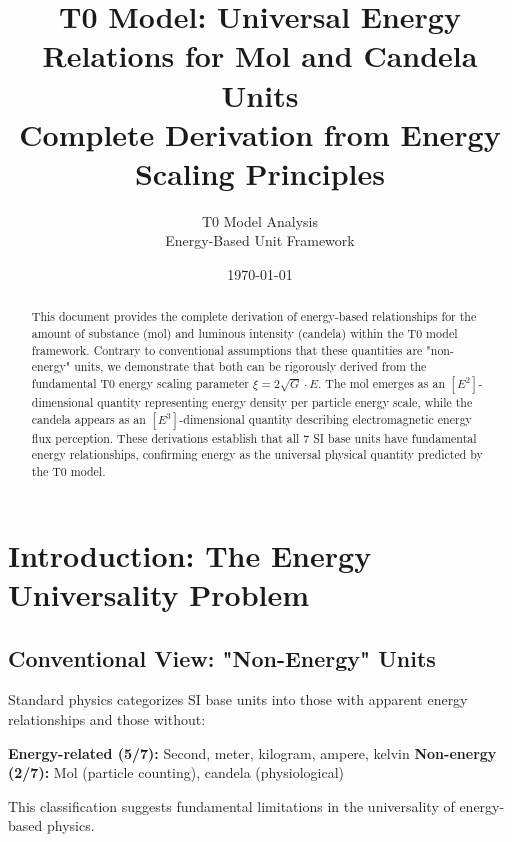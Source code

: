 \documentclass[12pt,a4paper]{article}
\newcommand{\xipar}{\xi}
\begin{document}
	
	\title{T0 Model: Universal Energy Relations for Mol and Candela Units\\
		\large Complete Derivation from Energy Scaling Principles}
	\author{T0 Model Analysis\\
		Energy-Based Unit Framework}
	\date{\today}
	
	\maketitle
	
	\begin{abstract}
		This document provides the complete derivation of energy-based relationships for the amount of substance (mol) and luminous intensity (candela) within the T0 model framework. Contrary to conventional assumptions that these quantities are "non-energy" units, we demonstrate that both can be rigorously derived from the fundamental T0 energy scaling parameter $\xipar = 2\sqrt{G} \cdot E$. The mol emerges as an $[E^2]$-dimensional quantity representing energy density per particle energy scale, while the candela appears as an $[E^3]$-dimensional quantity describing electromagnetic energy flux perception. These derivations establish that all 7 SI base units have fundamental energy relationships, confirming energy as the universal physical quantity predicted by the T0 model.
	\end{abstract}
	
	\tableofcontents
	\newpage
	
	\section{Introduction: The Energy Universality Problem}
	\label{sec:introduction}
	
	\subsection{Conventional View: "Non-Energy" Units}
	\label{subsec:conventional_view}
	
	Standard physics categorizes SI base units into those with apparent energy relationships and those without:
	
	\textbf{Energy-related (5/7):} Second, meter, kilogram, ampere, kelvin
	\textbf{Non-energy (2/7):} Mol (particle counting), candela (physiological)
	
	This classification suggests fundamental limitations in the universality of energy-based physics.
	
\end{document}
